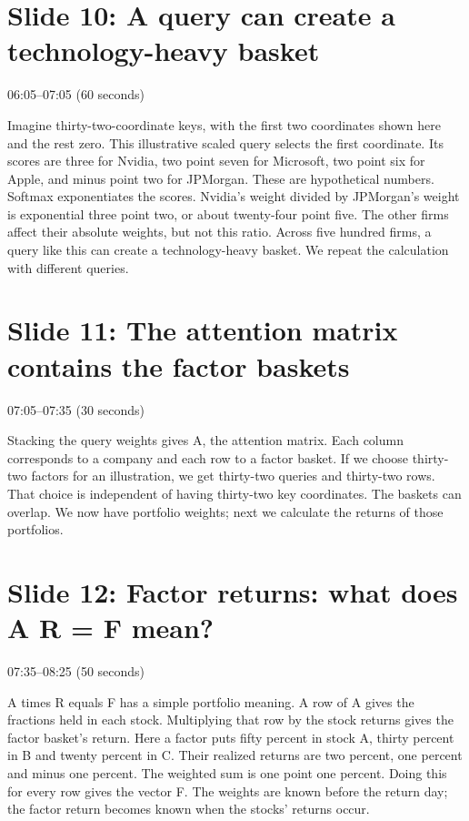 \documentclass[11pt]{article}
\begin{document}
\section*{Slide 10: A query can create a technology-heavy basket}

\textcolor{SBred}{06:05--07:05 (60 seconds)}

Imagine thirty-two-coordinate keys, with the first two coordinates shown here and the rest zero. This illustrative scaled query selects the first coordinate. Its scores are three for Nvidia, two point seven for Microsoft, two point six for Apple, and minus point two for JPMorgan. These are hypothetical numbers. Softmax exponentiates the scores. Nvidia's weight divided by JPMorgan's weight is exponential three point two, or about twenty-four point five. The other firms affect their absolute weights, but not this ratio. Across five hundred firms, a query like this can create a technology-heavy basket. We repeat the calculation with different queries.

\section*{Slide 11: The attention matrix contains the factor baskets}

\textcolor{SBred}{07:05--07:35 (30 seconds)}

Stacking the query weights gives A, the attention matrix. Each column corresponds to a company and each row to a factor basket. If we choose thirty-two factors for an illustration, we get thirty-two queries and thirty-two rows. That choice is independent of having thirty-two key coordinates. The baskets can overlap. We now have portfolio weights; next we calculate the returns of those portfolios.

\section*{Slide 12: Factor returns: what does A R = F mean?}

\textcolor{SBred}{07:35--08:25 (50 seconds)}

A times R equals F has a simple portfolio meaning. A row of A gives the fractions held in each stock. Multiplying that row by the stock returns gives the factor basket's return. Here a factor puts fifty percent in stock A, thirty percent in B and twenty percent in C. Their realized returns are two percent, one percent and minus one percent. The weighted sum is one point one percent. Doing this for every row gives the vector F. The weights are known before the return day; the factor return becomes known when the stocks' returns occur.
\end{document}
